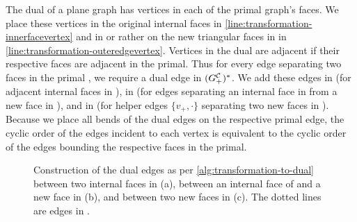 The dual of a plane graph has vertices in each of the primal graph's faces.
We place these vertices in the original internal faces in \cref{line:transformation-innerfacevertex} and in \emdash{} or rather on \emdash{} the new triangular faces in \clustergraph{+} in \cref{line:transformation-outeredgevertex}.
Vertices in the dual are adjacent if their respective faces are adjacent in the primal.
Thus for every edge separating two faces in the primal \clustergraph{+}, we require a dual edge in $(G^\mathcal{C}_{+})^*$.
We add these edges in  (for adjacent internal faces in \clustergraph{}), in  (for edges separating an internal face in \clustergraph{} from a new face in \clustergraph{+}), and in  (for helper edges $\{v_+,\cdot\}$ separating two new faces in \clustergraph{+}).
Because we place all bends of the dual edges on the respective primal edge, the cyclic order of the edges incident to each vertex is equivalent to the cyclic order of the edges bounding the respective faces in the primal.

\begin{figure}[H]
	\centering
	\quad
	\caption{Construction of the dual edges as per \cref{alg:transformation-to-dual} between two internal faces in \clustergraph{} (a), between an internal face of \clustergraph{} and a new face in \clustergraph{+} (b), and between two new faces in \clustergraph{+} (c). The dotted lines are edges in \clustergraph{}.}
	\label{fig:transformation-dual-edge-construction}
\end{figure}

